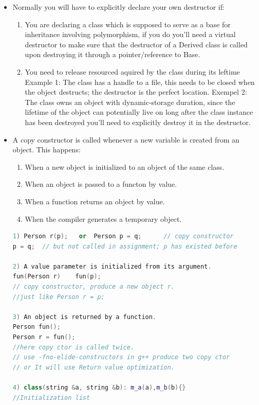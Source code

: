 \documentclass[a4paper,12pt,twoside]{book}
\begin{document}
\begin{itemize}
\item Normally you will have to explicitly declare your own destructor if:
\begin{enumerate}
\item You are declaring a class which is supposed to serve as a base for inheritance involving polymorphism, if you do you'll need a virtual destructor to make sure that the destructor of a Derived class is called upon destroying it through a pointer/reference to Base.
\item You need to release resourced aquired by the class during its leftime
Example 1: The class has a handle to a file, this needs to be closed when the object destructs; the destructor is the perfect location.
Exempel 2: The class owns an object with dynamic-storage duration, since the lifetime of the object can potentially live on long after the class instance has been destroyed you'll need to explicitly destroy it in the destructor.
\end{enumerate}


\item A copy constructor is called whenever a new variable is created from an object. This happens:

\begin{enumerate}
\item When a new object is initialized to an object of the same class.
\item When an object is passed to a functon by value.
\item When a function returns an object by value.
\item When the compiler generates a temporary object.
\end{enumerate}

\begin{lstlisting}[frame=single, language=c++]
1) Person r(p);   or  Person p = q;      // copy constructor
p = q;  // but not called in assignment; p has existed before

2) A value parameter is initialized from its argument.
fun(Person r)    fun(p);
// copy constructor, produce a new object r.
//just like Person r = p;

3) An object is returned by a function.
Person fun();
Person r = fun();
//here copy ctor is called twice.
// use -fno-elide-constructors in g++ produce two copy ctor
// or It will use Return value optimization.

4) class(string &a, string &b): m_a(a),m_b(b){}
//Initialization list
\end{lstlisting}


\end{itemize}
\end{document}

